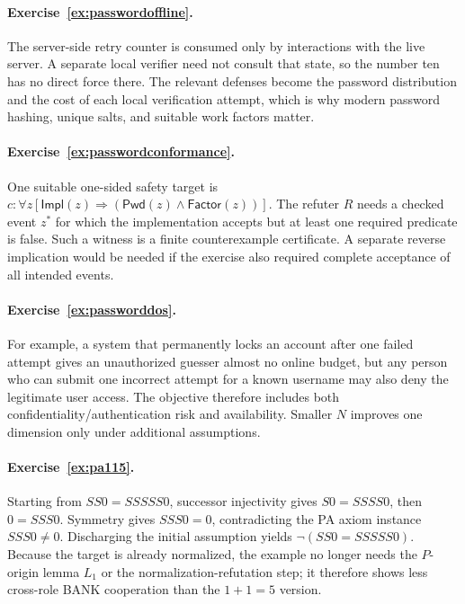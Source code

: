 \documentclass[11pt,openany]{book}
\theoremstyle{definition}
\theoremstyle{remark}
\begin{document}
\paragraph{Exercise~\ref{ex:passwordoffline}.}
The server-side retry counter is consumed only by interactions with the live server. A separate local verifier need not consult that state, so the number ten has no direct force there. The relevant defenses become the password distribution and the cost of each local verification attempt, which is why modern password hashing, unique salts, and suitable work factors matter.

\paragraph{Exercise~\ref{ex:passwordconformance}.}
One suitable one-sided safety target is $c:\forall z[\mathsf{Impl}(z)\Rightarrow(\mathsf{Pwd}(z)\wedge\mathsf{Factor}(z))]$. The refuter $R$ needs a checked event $z^*$ for which the implementation accepts but at least one required predicate is false. Such a witness is a finite counterexample certificate. A separate reverse implication would be needed if the exercise also required complete acceptance of all intended events.

\paragraph{Exercise~\ref{ex:passworddos}.}
For example, a system that permanently locks an account after one failed attempt gives an unauthorized guesser almost no online budget, but any person who can submit one incorrect attempt for a known username may also deny the legitimate user access. The objective therefore includes both confidentiality/authentication risk and availability. Smaller $N$ improves one dimension only under additional assumptions.


\paragraph{Exercise~\ref{ex:pa115}.}
Starting from $SS0=SSSSS0$, successor injectivity gives $S0=SSSS0$, then $0=SSS0$. Symmetry gives $SSS0=0$, contradicting the PA axiom instance $SSS0\neq0$. Discharging the initial assumption yields $\neg(SS0=SSSSS0)$. Because the target is already normalized, the example no longer needs the $P$-origin lemma $L_1$ or the normalization-refutation step; it therefore shows less cross-role BANK cooperation than the $1+1=5$ version.
\end{document}
